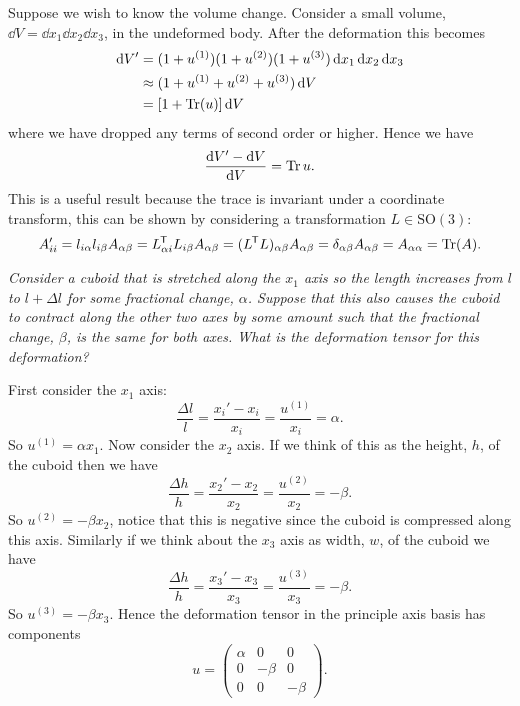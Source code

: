 \documentclass[a4paper]{article}
\newcommand{\specialOrthogonalGroup}{\mathrm{SO}}
\begin{document}
    Suppose we wish to know the volume change.
    Consider a small volume, \(\dd{V} = \dd{x_1}\dd{x_2}\dd{x_3}\), in the undeformed body.
    After the deformation this becomes
    \begin{align*}
        \dd{V'} &= (1 + u^{(1)})(1 + u^{(2)})(1 + u^{(3)})\dd{x_1}\dd{x_2}\dd{x_3}\\
        &\approx (1 + u^{(1)} + u^{(2)} + u^{(3)})\dd{V}\\
        &= [1 + \Tr (u)]\dd{V}
    \end{align*}
    where we have dropped any terms of second order or higher.
    Hence we have
    \[\frac{\dd{V'} - \dd{V}}{\dd{V}} = \Tr u.\]
    This is a useful result because the trace is invariant under a coordinate transform, this can be shown by considering a transformation \(L\in\specialOrthogonalGroup(3)\):
    \[A'_{ii} = l_{i\alpha}l_{i\beta}A_{\alpha\beta} = L^{\mkern-1.5mu\mathsf{T}}_{\alpha i}L_{i\beta}A_{\alpha\beta} = (L^{\mkern-1.5mu\mathsf{T}} L)_{\alpha\beta} A_{\alpha\beta} = \delta_{\alpha\beta}A_{\alpha\beta} = A_{\alpha\alpha} = \Tr(A).\]
    \begin{example}
        \textit{Consider a cuboid that is stretched along the \(x_1\) axis so the length increases from \(l\) to \(l + \Delta l\) for some fractional change, \(\alpha\). Suppose that this also causes the cuboid to contract along the other two axes by some amount such that the fractional change, \(\beta\), is the same for both axes. What is the deformation tensor for this deformation?}
        
        First consider the \(x_1\) axis:
        \[\frac{\Delta l}{l} = \frac{x_i' - x_i}{x_i} = \frac{u^{(1)}}{x_i} = \alpha.\]
        So \(u^{(1)} = \alpha x_1\).
        Now consider the \(x_2\) axis.
        If we think of this as the height, \(h\), of the cuboid then we have
        \[\frac{\Delta h}{h} = \frac{x_2' - x_2}{x_2} = \frac{u^{(2)}}{x_2} = -\beta.\]
        So \(u^{(2)} = -\beta x_2\), notice that this is negative since the cuboid is compressed along this axis.
        Similarly if we think about the \(x_3\) axis as width, \(w\), of the cuboid we have
        \[\frac{\Delta h}{h} = \frac{x_3' - x_3}{x_3} = \frac{u^{(3)}}{x_3} = -\beta.\]
        So \(u^{(3)} = -\beta x_3\).
        Hence the deformation tensor in the principle axis basis has components
        \[
            u =
            \begin{pmatrix}
                \alpha & 0 & 0\\
                0 & -\beta & 0\\
                0 & 0 & -\beta
            \end{pmatrix}
            .
        \]
    \end{example}
\end{document}
